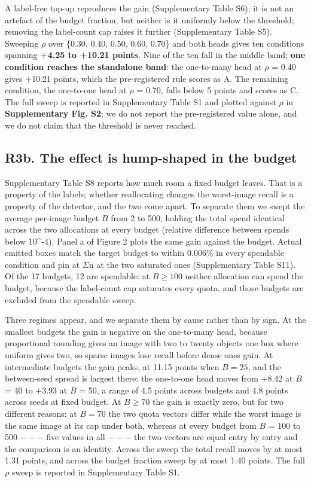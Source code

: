 \documentclass[sn-mathphys,Numbered]{sn-jnl}
\begin{document}
A label-free top-up reproduces the gain (Supplementary Table S6); it is not an artefact of the budget fraction, but neither is it uniformly below the threshold; removing the label-count cap raises it further (Supplementary Table S5). Sweeping $\rho$ over \{0.30, 0.40, 0.50, 0.60, 0.70\} and both heads gives ten conditions spanning \textbf{+4.25 to +10.21 points}. Nine of the ten fall in the middle band; \textbf{one condition reaches the standalone band}: the one-to-many head at $\rho$ = 0.40 gives +10.21 points, which the pre-registered rule scores as A. The remaining condition, the one-to-one head at $\rho$ = 0.70, falls below 5 points and scores as C. The full sweep is reported in Supplementary Table S1 and plotted against $\rho$ in \textbf{Supplementary Fig. S2}; we do not report the pre-registered value alone, and we do not claim that the threshold is never reached.

\subsection{R3b. The effect is hump-shaped in the budget}

Supplementary Table S8 reports how much room a fixed budget leaves. That is a property of the labels; whether reallocating changes the worst-image recall is a property of the detector, and the two come apart. To separate them we swept the average per-image budget $B$ from 2 to 500, holding the total spend identical across the two allocations at every budget (relative difference between spends below 10\textasciicircum{}-4). Panel a of Figure 2 plots the same gain against the budget. Actual emitted boxes match the target budget to within 0.006\% in every spendable condition and pin at $\Sigma$n at the two saturated ones (Supplementary Table S11). Of the 17 budgets, 12 are spendable: at $B \geq{} 100$ neither allocation can spend the budget, because the label-count cap saturates every quota, and those budgets are excluded from the spendable sweep.

Three regimes appear, and we separate them by cause rather than by sign. At the smallest budgets the gain is negative on the one-to-many head, because proportional rounding gives an image with two to twenty objects one box where uniform gives two, so sparse images lose recall before dense ones gain. At intermediate budgets the gain peaks, at 11.15 points when $B = 25$, and the between-seed spread is largest there: the one-to-one head moves from +8.42 at $B$ = 40 to +3.93 at $B$ = 50, a range of 4.5 points across budgets and 4.8 points across seeds at fixed budget. At $B \geq{} 70$ the gain is exactly zero, but for two different reasons: at $B = 70$ the two quota vectors differ while the worst image is the same image at its cap under both, whereas at every budget from $B$ = 100 to 500 $---$ five values in all $---$ the two vectors are equal entry by entry and the comparison is an identity. Across the sweep the total recall moves by at most 1.31 points, and across the budget fraction sweep by at most 1.40 points. The full $\rho$ sweep is reported in Supplementary Table S1.
\end{document}
